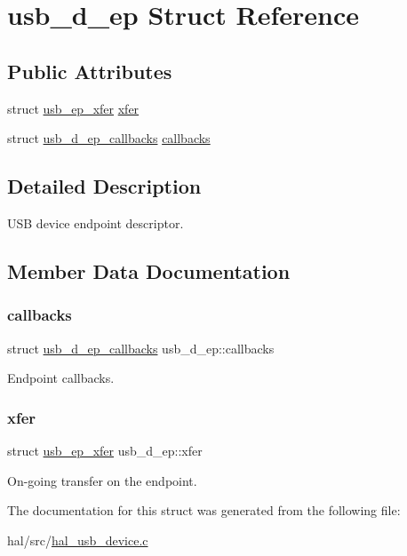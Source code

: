 \hypertarget{structusb__d__ep}{}\section{usb\+\_\+d\+\_\+ep Struct Reference}
\label{structusb__d__ep}
\subsection*{Public Attributes}
\begin{DoxyCompactItemize}
\item 
struct \hyperlink{structusb__ep__xfer}{usb\+\_\+ep\+\_\+xfer} \hyperlink{structusb__d__ep_abf293e08eaa59deefd2edeee4258f5ec}{xfer}
\item 
struct \hyperlink{structusb__d__ep__callbacks}{usb\+\_\+d\+\_\+ep\+\_\+callbacks} \hyperlink{structusb__d__ep_a4190b1c0a464acffadb920ac5397cf41}{callbacks}
\end{DoxyCompactItemize}


\subsection{Detailed Description}
U\+SB device endpoint descriptor. 

\subsection{Member Data Documentation}
\mbox{\label{structusb__d__ep_a4190b1c0a464acffadb920ac5397cf41}} 
\subsubsection{\texorpdfstring{callbacks}{callbacks}}
{\footnotesize\ttfamily struct \hyperlink{structusb__d__ep__callbacks}{usb\+\_\+d\+\_\+ep\+\_\+callbacks} usb\+\_\+d\+\_\+ep\+::callbacks}

Endpoint callbacks. \mbox{\label{structusb__d__ep_abf293e08eaa59deefd2edeee4258f5ec}} 
\subsubsection{\texorpdfstring{xfer}{xfer}}
{\footnotesize\ttfamily struct \hyperlink{structusb__ep__xfer}{usb\+\_\+ep\+\_\+xfer} usb\+\_\+d\+\_\+ep\+::xfer}

On-\/going transfer on the endpoint. 

The documentation for this struct was generated from the following file\+:\begin{DoxyCompactItemize}
\item 
hal/src/\hyperlink{hal__usb__device_8c}{hal\+\_\+usb\+\_\+device.\+c}\end{DoxyCompactItemize}
